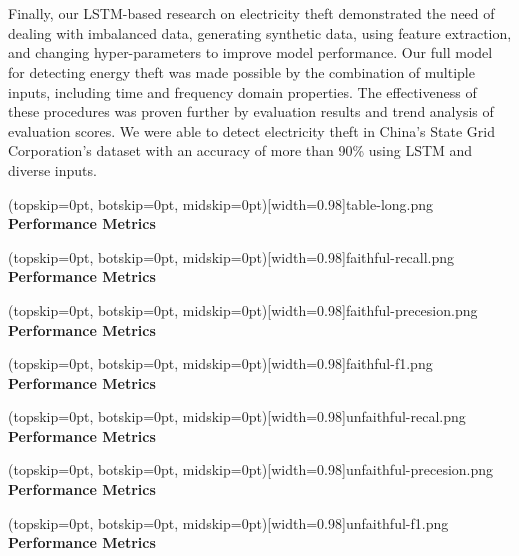 \documentclass{ieeeaccess}
\begin{document}
\\
\\
Finally, our LSTM-based research on electricity theft demonstrated the need of dealing with imbalanced data, generating synthetic data, using feature extraction, and changing hyper-parameters to improve model performance. Our full model for detecting energy theft was made possible by the combination of multiple inputs, including time and frequency domain properties. The effectiveness of these procedures was proven further by evaluation results and trend analysis of evaluation scores. We were able to detect electricity theft in China's State Grid Corporation's dataset with an accuracy of more than 90\% using LSTM and diverse inputs.

\Figure[t!](topskip=0pt, botskip=0pt, midskip=0pt)[width=0.98\linewidth]{table-long.png}
{ \textbf{Performance Metrics}\label{fig8}}

\Figure[t!](topskip=0pt, botskip=0pt, midskip=0pt)[width=0.98\linewidth]{faithful-recall.png}
{ \textbf{Performance Metrics}\label{fig9}}

\Figure[t!](topskip=0pt, botskip=0pt, midskip=0pt)[width=0.98\linewidth]{faithful-precesion.png}
{ \textbf{Performance Metrics}\label{fig10}}

\Figure[t!](topskip=0pt, botskip=0pt, midskip=0pt)[width=0.98\linewidth]{faithful-f1.png}
{ \textbf{Performance Metrics}\label{fig11}}

\Figure[t!](topskip=0pt, botskip=0pt, midskip=0pt)[width=0.98\linewidth]{unfaithful-recal.png}
{ \textbf{Performance Metrics}\label{fig12}}

\Figure[t!](topskip=0pt, botskip=0pt, midskip=0pt)[width=0.98\linewidth]{unfaithful-precesion.png}
{ \textbf{Performance Metrics}\label{fig13}}

\Figure[t!](topskip=0pt, botskip=0pt, midskip=0pt)[width=0.98\linewidth]{unfaithful-f1.png}
{ \textbf{Performance Metrics}\label{fig14}}
\end{document}
